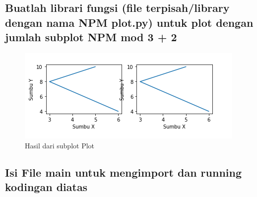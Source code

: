 \subsection{Buatlah librari fungsi (ﬁle terpisah/library dengan nama NPM plot.py) untuk plot dengan jumlah subplot NPM mod 3 + 2}



\begin{figure}[h]
\centering
\includegraphics[scale=0.9]{figures/6/Praktek/1174002/plot.png}
\caption{Hasil dari subplot Plot}
\label{fig:contoh}
\end{figure}

\subsection{Isi File main untuk mengimport dan running kodingan diatas}



